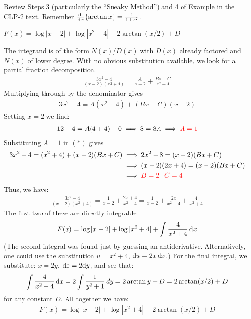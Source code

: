\begin{hint}
Review Steps 3 (particularly the ``Sneaky Method'') and 4 of
Example 
in the %
CLP-2 text. Remember $\diff{}{x}\{\arctan x\} = \frac{1}{1+x^2}$.
\end{hint}

\begin{answer}
$ F(x) = \log |x-2| + \log |x^2+4| + 2\arctan (x/2) + D$
\end{answer}

\begin{solution}
The integrand is of the form $N(x)/D(x)$ with $D(x)$ already factored
and $N(x)$ of lower degree. With no obvious substitution available, we look for a partial fraction decomposition.
\begin{align*}
\frac{3x^2 -4}{(x-2)(x^2+4)} = \frac{A}{x-2} + \frac{Bx + C}{x^2+4}
\end{align*}
Multiplying through by the denominator gives
\begin{align}
3x^2 -4 = A(x^2+4) + (Bx + C)(x-2)
\tag{$*$}
\end{align}
Setting $x=2$ we find:
\begin{align*}
   12 -4 = A(4 + 4) + 0 \implies 8 =8A  \implies \color{red}A = 1
\end{align*}
Substituting $A=1$ in $(*)$ gives
\begin{align*}
 3x^2 -4  = (x^2+4) + (x-2)(Bx + C)
  &\implies   2x^2-8 =(x-2)(Bx + C) \\
  &\implies   (x-2)(2x+4)=(x-2)(Bx + C) \\
  & \implies \color{red} B=2,~C=4
\end{align*}
Thus, we have:
\begin{align*}
 \frac{3x^2 -4}{(x-2)(x^2+4)} = \frac{1}{x-2} + \frac{2x + 4}{x^2+4} = \frac{1}{x-2} + \frac{2x }{x^2+4} + \frac{4}{x^2+4 }
\end{align*}
The first two of these are directly integrable:
\begin{align*}
  F(x) = \log |x-2| + \log |x^2+4| + \int \frac{4}{x^2+4}\,\mathrm{d}x
\end{align*}
(The second integral was found just by guessing an antiderivative.
Alternatively, one could use the substitution $u=x^2+4$, $\mathrm{d}u=2x\,\mathrm{d}x$.)
For the final integral, we substitute: $x = 2y$,
$\mathrm{d}x = 2\mathrm{d}y$, and see that:
\begin{align*}
  \int \frac{4}{x^2+4}\,\mathrm{d}x  = 2 \int \frac{1}{y^2 + 1}\,dy = 2 \arctan y + D = 2\arctan (x/2) + D
\end{align*}
for any constant $D$. All together we have:
\begin{align*}
   F(x) = \log |x-2| + \log |x^2+4| + 2\arctan (x/2) + D
\end{align*}
\end{solution}

